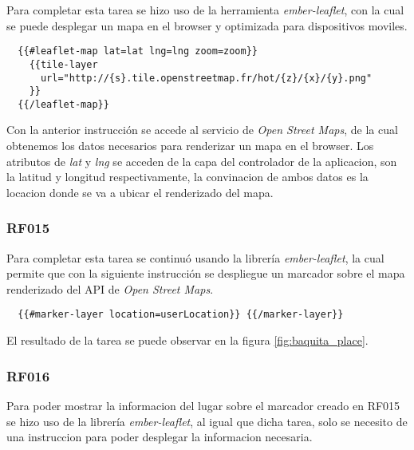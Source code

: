 
Para completar esta tarea se hizo uso de la herramienta \emph{ember-leaflet}, con la cual se puede desplegar un mapa en el browser y optimizada para dispositivos moviles.\\

\begin{verbatim}
  {{#leaflet-map lat=lat lng=lng zoom=zoom}}
    {{tile-layer
      url="http://{s}.tile.openstreetmap.fr/hot/{z}/{x}/{y}.png"
    }}
  {{/leaflet-map}}
\end{verbatim}

Con la anterior instrucción se accede al servicio de \emph{Open Street Maps}, de la cual obtenemos los datos necesarios para renderizar un mapa en el browser. Los atributos de \emph{lat} y \emph{lng} se acceden de la capa del controlador de la aplicacion, son la latitud y longitud respectivamente, la convinacion de ambos datos es la locacion donde se va a ubicar el renderizado del mapa.\\

%

\subsubsection{RF015}
\label{subs:RF015}

Para completar esta tarea se continuó usando la librería \emph{ember-leaflet}, la cual permite que con la siguiente instrucción se despliegue un marcador sobre el mapa renderizado del API de \emph{Open Street Maps}.

\begin{verbatim}
  {{#marker-layer location=userLocation}} {{/marker-layer}}
\end{verbatim}

El resultado de la tarea se puede observar en la figura \ref{fig:baquita_place}.

\subsubsection{RF016}
\label{subs:RF016}

Para poder mostrar la informacion del lugar sobre el marcador creado en RF015 se hizo uso de la librería \emph{ember-leaflet}, al igual que dicha tarea, solo se necesito de una instruccion para poder desplegar la informacion necesaria.

